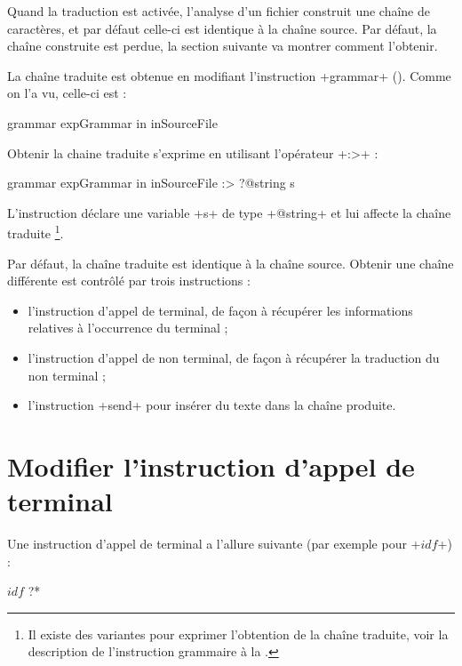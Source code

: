 Quand la traduction est activée, l'analyse d'un fichier construit une chaîne de caractères, et par défaut celle-ci est identique à la chaîne source. Par défaut, la chaîne construite est perdue, la section suivante va montrer comment l'obtenir.









La chaîne traduite est obtenue en modifiant l'instruction \ggs+grammar+ (). Comme on l'a vu, celle-ci est : 
\begin{galgascode}
grammar expGrammar in inSourceFile
\end{galgascode}

Obtenir la chaine traduite s'exprime en utilisant l'opérateur  \ggs+:>+ :
\begin{galgascode}
grammar expGrammar in inSourceFile :> ?@string s
\end{galgascode}

L'instruction déclare une variable \ggs+s+ de type \ggs+@string+ et lui affecte la chaîne traduite \footnote{Il existe des variantes pour exprimer l'obtention de la chaîne traduite, voir la description de l'instruction grammaire à la .}.

Par défaut, la chaîne traduite est identique à la chaîne source. Obtenir une chaîne différente est contrôlé par trois instructions :
\begin{itemize}
  \item l'instruction d'appel de terminal, de façon à récupérer les informations relatives à l'occurrence du terminal ;
  \item l'instruction d'appel de non terminal, de façon à récupérer la traduction du non terminal ;
  \item l'instruction \ggs+send+ pour insérer du texte dans la chaîne produite.
\end{itemize}







\section{Modifier l'instruction d'appel de terminal}

Une instruction d'appel de terminal a l'allure suivante (par exemple pour \ggs+$idf$+) :
\begin{galgascode}
$idf$ ?*
\end{galgascode}

